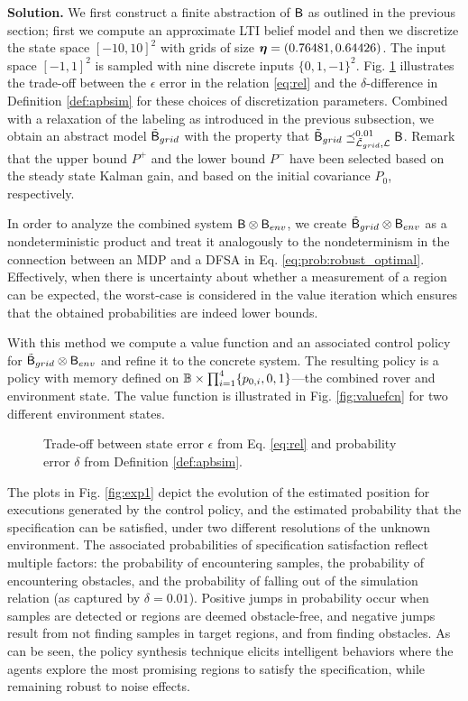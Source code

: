 \documentclass{ifacconf}
\begin{document}
\textbf{Solution.} We first construct a finite abstraction of $\mathsf{B}$ as outlined in the previous section; first we compute an approximate LTI belief model and then we  discretize the state space $[-10, 10]^2$ with  grids of size ${\boldsymbol{\eta}} = (0.76481, 0.64426)$. The input space $[-1,1]^2$ is sampled with nine discrete inputs $\{0, 1, -1\}^2$. Fig.  \ref{fig:tradeoff} illustrates the trade-off between the $\epsilon$ error in the relation \eqref{eq:rel} and the $\delta$-difference in Definition \ref{def:apbsim} for these choices of discretization parameters. Combined with a relaxation of the labeling as introduced in the previous subsection, %
we obtain an abstract model $\tilde {\mathsf{B}}_{grid}$ with the property that $\tilde {\mathsf{B}}_{grid}\preceq^{0.01}_{\tilde{\mathcal{L}}_{grid},\mathcal{L}} \mathsf{B} $. Remark that the upper bound $P^+$ and the lower bound $P^- $ have been selected based on the steady state Kalman gain, and based on the initial covariance $P_0$, respectively.

In order to analyze the combined system $\mathsf{B} \otimes \mathsf{B}_{env}$, we create $\tilde {\mathsf{B}}_{grid} \otimes \mathsf{B}_{env}$ as a nondeterministic product and treat it analogously to the nondeterminism in the connection between an MDP and a DFSA in Eq. \eqref{eq:prob:robust_optimal}. Effectively, when there is uncertainty about whether a measurement of a region can be expected, the worst-case is considered in the value iteration which ensures that the obtained probabilities are indeed lower bounds. 

With this method we compute a value function and an associated control policy for $\tilde {\mathsf{B}}_{grid} \otimes \mathsf{B}_{env}$ and refine it to the concrete system.  The resulting policy is a policy with memory defined on $\mathbb{B} \times \prod_{i=1}^4 \{ p_{0,i}, 0, 1 \}$---the combined rover and environment state. The value function is illustrated in Fig. \ref{fig:valuefcn} for two different environment states.

\begin{figure}
  \footnotesize
  
  \caption{Trade-off between state error $\epsilon$ from Eq. \eqref{eq:rel} and probability error $\delta$ from Definition \ref{def:apbsim}.}
  \label{fig:tradeoff}
\end{figure}

The plots in Fig. \ref{fig:exp1} depict the evolution of the estimated position for executions generated by the control policy, and the estimated probability that the specification can be satisfied, under two different resolutions of the unknown environment. The associated probabilities of specification satisfaction reflect multiple factors: the probability of encountering samples, the probability of encountering obstacles, and the probability of falling out of the simulation relation (as captured by $\delta = 0.01$). Positive jumps in probability occur when samples are detected or regions are deemed obstacle-free, and negative jumps result from not finding samples in target regions, and from finding obstacles. As can be seen, the policy synthesis technique elicits intelligent behaviors where the agents explore the most promising regions to satisfy the specification, while remaining robust to noise effects.
\end{document}
